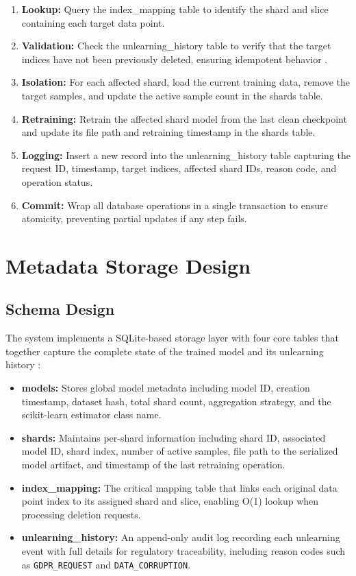 \begin{enumerate}
    \item \textbf{Lookup:} Query the index\_mapping table to identify the shard and slice containing each target data point.
    \item \textbf{Validation:} Check the unlearning\_history table to verify that the target indices have not been previously deleted, ensuring idempotent behavior \cite{schelter2021heterogeneous}.
    \item \textbf{Isolation:} For each affected shard, load the current training data, remove the target samples, and update the active sample count in the shards table.
    \item \textbf{Retraining:} Retrain the affected shard model from the last clean checkpoint and update its file path and retraining timestamp in the shards table.
    \item \textbf{Logging:} Insert a new record into the unlearning\_history table capturing the request ID, timestamp, target indices, affected shard IDs, reason code, and operation status.
    \item \textbf{Commit:} Wrap all database operations in a single transaction to ensure atomicity, preventing partial updates if any step fails.
\end{enumerate}

\section{Metadata Storage Design}

\subsection{Schema Design}

The system implements a SQLite-based storage layer with four core tables that together capture the complete state of the trained model and its unlearning history \cite{schelter2021heterogeneous}:

\begin{itemize}
    \item \textbf{models:} Stores global model metadata including model ID, creation timestamp, dataset hash, total shard count, aggregation strategy, and the scikit-learn estimator class name.
    \item \textbf{shards:} Maintains per-shard information including shard ID, associated model ID, shard index, number of active samples, file path to the serialized model artifact, and timestamp of the last retraining operation.
    \item \textbf{index\_mapping:} The critical mapping table that links each original data point index to its assigned shard and slice, enabling O(1) lookup when processing deletion requests.
    \item \textbf{unlearning\_history:} An append-only audit log recording each unlearning event with full details for regulatory traceability, including reason codes such as \texttt{GDPR\_REQUEST} and \texttt{DATA\_CORRUPTION}.
\end{itemize}

